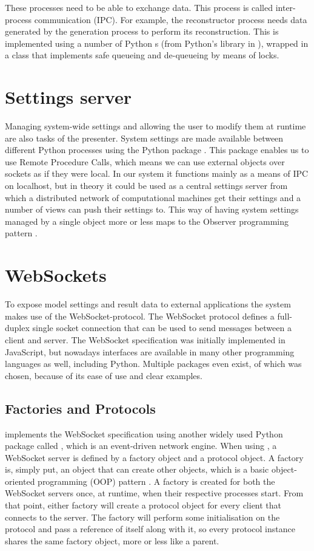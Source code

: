 \documentclass[a4paper, openany, oneside]{memoir}
\begin{document}
These processes need to be able to exchange data. This process is called inter-process communication (IPC). For example, the reconstructor process needs data generated by the generation process to perform its reconstruction. This is implemented using a number of Python s (from Python's  library in \cite{pythonref}), wrapped in a class that implements safe queueing and de-queueing by means of locks.

\section{Settings server}
\label{sec:settings_server}
Managing system-wide settings and allowing the user to modify them at runtime are also tasks of the presenter. System settings are made available between different Python processes using the Python package . This package enables us to use Remote Procedure Calls, which means we can use external objects over sockets as if they were local. In our system it functions mainly as a means of IPC on localhost, but in theory it could be used as a central settings server from which a distributed network of computational machines get their settings and a number of views can push their settings to. This way of having system settings managed by a single object more or less maps to the Observer programming pattern \cite{msdn-observer}.

\section{WebSockets}
\label{sec:websockets}
To expose model settings and result data to external applications the system makes use of the WebSocket-protocol. The WebSocket protocol defines a full-duplex single socket connection that can be used to send messages between a client and server. The WebSocket specification was initially implemented in JavaScript, but nowadays interfaces are available in many other programming languages as well, including Python. Multiple packages even exist, of which  was chosen, because of its ease of use and clear examples.

\subsection{Factories and Protocols}
\label{sub:presenter-autobahn}
 implements the WebSocket specification using another widely used Python package called , which is an event-driven network engine. When using , a WebSocket server is defined by a factory object and a protocol object. A factory is, simply put, an object that can create other objects, which is a basic object-oriented programming (OOP) pattern \cite{msdn-observer}. A factory is created for both the WebSocket servers once, at runtime, when their respective processes start. From that point, either factory will create a protocol object for every client that connects to the server. The factory will perform some initialisation on the protocol and pass a reference of itself along with it, so every protocol instance shares the same factory object, more or less like a parent.
\end{document}
